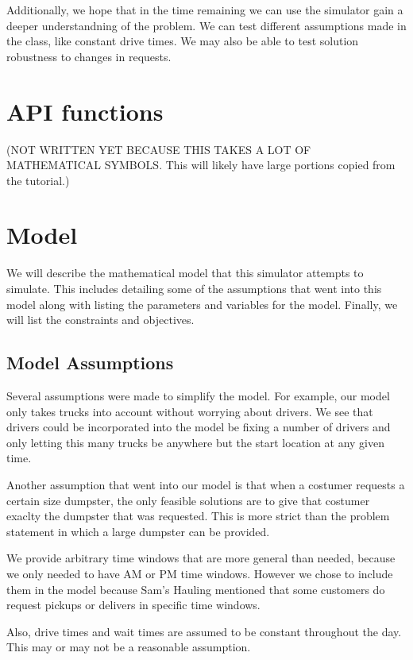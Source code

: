 \documentclass{article}
\begin{document}
Additionally, we hope that in the time remaining we can use the simulator gain a deeper understandning of the problem.
We can test different assumptions made in the class, like constant drive times.
We may also be able to test solution robustness to changes in requests.

\section{API functions}

(NOT WRITTEN YET BECAUSE THIS TAKES A LOT OF MATHEMATICAL SYMBOLS. This will likely have large portions copied from the tutorial.)

\section{Model}
We will describe the mathematical model that this simulator attempts to simulate.
This includes detailing some of the assumptions that went into this model along with listing the parameters and variables for the model.
Finally, we will list the constraints and objectives.

\subsection{Model Assumptions}

Several assumptions were made to simplify the model.
For example, our model only takes trucks into account without worrying about drivers.
We see that drivers could be incorporated into the model be fixing a number of drivers and only letting this many trucks be anywhere but the start location at any given time.

Another assumption that went into our model is that when a costumer requests a certain size dumpster, the only feasible solutions are to give that costumer exaclty the dumpster that was requested.
This is more strict than the problem statement in which a large dumpster can be provided.

We provide arbitrary time windows that are more general than needed, because we only needed to have AM or PM time windows.
However we chose to include them in the model because Sam's Hauling mentioned that some customers do request pickups or delivers in specific time windows.

Also, drive times and wait times are assumed to be constant throughout the day.
This may or may not be a reasonable assumption.
\end{document}
